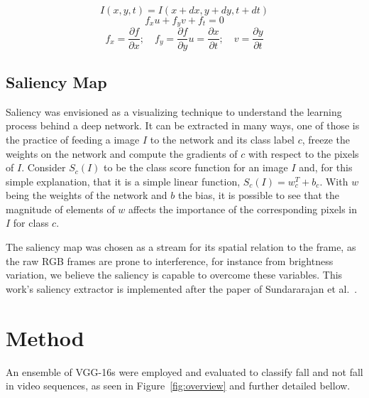 \documentclass[conference]{IEEEtran}
\begin{document}
\begin{equation}
\label{eq:of-dist}
I(x, y, t)=I(x+dx, y+dy, t+dt)
\end{equation}
\begin{equation}
\label{eq:of}
f_xu + f_yv + f_t=0
\end{equation}
\begin{equation}
\label{eq:of-grad}
f_x = \frac{\partial f}{\partial x}; \quad f_y = \frac{\partial f}{\partial y}u = \frac{\partial x}{\partial t}; \quad v = \frac{\partial y}{\partial t}
\end{equation}

\subsection{Saliency Map}
\label{sec:saliency}

Saliency was envisioned as a visualizing technique to understand the learning process behind a deep network. It can be extracted in many ways, one of those is the practice of feeding a image $I$ to the network and its class label $c$, freeze the weights on the network and compute the gradients of $c$ with respect to the pixels of $I$. Consider $S_c(I)$ to be the class score function for an image $I$ and, for this simple explanation, that it is a simple linear function, $S_c(I) = w_c^{T} + b_c$. With $w$ being the weights of the network and $b$ the bias, it is possible to see that the magnitude of elements of $w$ affects the importance of the corresponding pixels in $I$ for class $c$.

The saliency map was chosen as a stream for its spatial relation to the frame, as the raw RGB frames are prone to interference, for instance from brightness variation, we believe the saliency is capable to overcome these variables. This work's saliency extractor is implemented after the paper of Sundararajan et al.~\cite{sundararajan2017axiomatic}.

\section{Method}

An ensemble of VGG-16s were employed and evaluated to classify fall and not fall in video sequences, as seen in Figure~\ref{fig:overview} and further detailed bellow.

\end{document}
